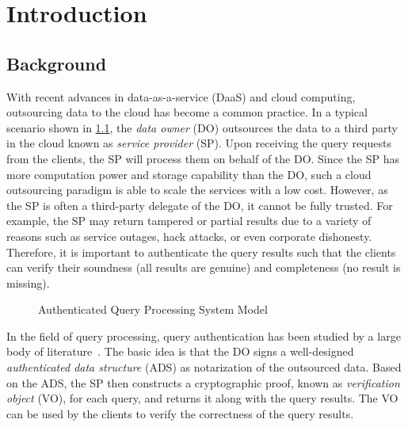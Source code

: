 \chapter{Introduction}\label{chap:intro}

\section{Background}

With recent advances in data-as-a-service (DaaS) and cloud computing, outsourcing data to the cloud has become a common practice. In a typical scenario shown in \cref{fig:intro:model}, the \emph{data owner} (DO) outsources the data to a third party in the cloud known as \emph{service provider} (SP). Upon receiving the query requests from the clients, the SP will process them on behalf of the DO\@. Since the SP has more computation power and storage capability than the DO, such a cloud outsourcing paradigm is able to scale the services with a low cost. However, as the SP is often a third-party delegate of the DO, it cannot be fully trusted. For example, the SP may return tampered or partial results due to a variety of reasons such as service outages, hack attacks, or even corporate dishonesty. Therefore, it is important to authenticate the query results such that the clients can verify their soundness (all results are genuine) and completeness (no result is missing).

\begin{figure}[h]
  \centering
  \resizebox{.7\linewidth}{!}{}
  \caption{Authenticated Query Processing System Model}\label{fig:intro:model}
\end{figure}

In the field of query processing, query authentication has been studied by a large body of literature~\cite{10.1109/ICDE.2004.1320027,10.1145/1142473.1142488,10.1007/s00778-008-0113-2,10.1145/1880022.1880026,10.1145/2213836.2213871,10.1145/2463676.2465281,10.14778/2732219.2732224,10.1145/2664243.2664244,10.1145/2723372.2747649,10.1109/tkde.2014.2316818}. The basic idea is that the DO signs a well-designed \emph{authenticated data structure} (ADS) as notarization of the outsourced data. Based on the ADS, the SP then constructs a cryptographic proof, known as \emph{verification object} (VO), for each query, and returns it along with the query results. The VO can be used by the clients to verify the correctness of the query results.

